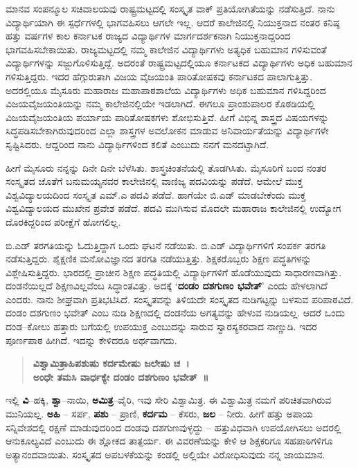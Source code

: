 ಮಾನವ ಸಂಪನ್ಮೂಲ ಸಚಿವಾಲಯವು ರಾಷ್ಟ್ರಮಟ್ಟದಲ್ಲಿ ಸಂಸ್ಕೃತ ವಾಕ್ ಪ್ರತಿಯೋಗಿತೆಯನ್ನು ನಡೆಸುತ್ತಿದೆ.  ನಾನು ವಿದ್ಯಾರ್ಥಿಯಾಗಿ ಈ ಸ್ಪರ್ಧೆಗಳಲ್ಲಿ ಭಾಗವಹಿಸಲು ಆಗಲೇ ಇಲ್ಲ.  ಆದರೆ ಕಾಲೇಜಿನಲ್ಲಿ ನಿಯುಕ್ತನಾದ ನಂತರ ಕನಿಷ್ಠ ಹತ್ತು ವರ್ಷಗಳ ಕಾಲ ಕರ್ನಾಟಕ ರಾಜ್ಯದ ವಿದ್ಯಾರ್ಥಿಗಳ ಮಾರ್ಗದರ್ಶಕನಾಗಿ ನಿಯುಕ್ತನಾದ್ದರಿಂದ ಭಾಗವಹಿಸಬೇಕಾಯಿತು.  ರಾಜ್ಯಮಟ್ಟದಲ್ಲಿ ನಮ್ಮ ಕಾಲೇಜಿನ ವಿದ್ಯಾರ್ಥಿಗಳು ಅತ್ಯಧಿಕ ಬಹುಮಾನ ಗಳಿಸುವಂತೆ ವಿದ್ಯಾರ್ಥಿಗಳನ್ನು ಸಜ್ಜುಗೊಳಿಸುತ್ತಿದ್ದೆ.  ಅದರಂತೆ ರಾಷ್ಟ್ರಮಟ್ಟದಲ್ಲಿಯೂ ಕರ್ನಾಟಕದ ವಿದ್ಯಾರ್ಥಿಗಳು ಅಧಿಕ ಬಹುಮಾನ ಗಳಿಸುತ್ತಿದ್ದರು.  ಇದರ ಹೆಗ್ಗುರುತಾಗಿ ವಿಜಯ ವೈಜಯಂತಿ ಪಾರಿತೋಷಕವು ಕರ್ನಾಟಕದ ಪಾಲಾಗುತ್ತಿತ್ತು.  ಅದರಲ್ಲಿಯೂ ಮೈಸೂರು ಮಹಾರಾಜ ಮಹಾಪಾಠಶಾಲೆಯ ವಿದ್ಯಾರ್ಥಿಗಳು ಅಧಿಕ ಬಹುಮಾನ ಗಳಿಸಿದ್ದರಿಂದ ವಿಜಯವೈಜಯಂತಿಯನ್ನು ನಮ್ಮ ಕಾಲೇಜಿನಲ್ಲಿಯೇ ಇಡಲಾಗಿದೆ.  ಈಗಲೂ ಪ್ರಾಂಶುಪಾಲರ ಕೊಠಡಿಯಲ್ಲಿ ವಿಜಯವೈಜಯಂತಿಯ ಪರ್ಯಾಯ ಪಾರಿತೋಷಕಗಳು ಶೋಭಿಸುತ್ತಿವೆ.  ಹೀಗೆ ವಿಭಿನ್ನ ಶಾಸ್ತ್ರದ ವಿಷಯಗಳನ್ನು ಸಿದ್ಧಪಡಿಸಬೇಕಾಗಿರುವುದರಿಂದ ಎಲ್ಲಾ ಶಾಸ್ತ್ರಗಳ ಅವಲೋಕನ ಮಾಡುವ ಅನಿವಾರ್ಯತೆಯನ್ನು ವಿದ್ಯಾರ್ಥಿಗಳೇ ಸೃಷ್ಟಿಸಿದರು.   ಆದ್ದರಿಂದ ನಾನು ವಿದ್ಯಾರ್ಥಿಗಳಿಂದ ಕಲಿತೆ ಎಂಬುದು ನನಗೆ ಮನದಟ್ಟಾಗಿದೆ.  

ಹೀಗೆ ಮೈಸೂರು ನನ್ನನ್ನು ದಿನೇ ದಿನೇ ಬೆಳೆಸಿತು.  ಶಾಸ್ತ್ರಚಿಂತನೆಯಲ್ಲಿ ತೊಡಗಿಸಿತು.  ಮೈಸೂರಿಗೆ ಬಂದ ನಂತರ ಸಂಸ್ಕೃತದ ಜೊತೆಗೆ ಬನುಮಯ್ಯನವರ ಕಾಲೇಜಿನಲ್ಲಿ ವಾಣಿಜ್ಯ ಪದವಿಯನ್ನು ಪಡೆದೆ. ಆಮೇಲೆ ಮುಕ್ತ ವಿಶ್ವವಿದ್ಯಾಲಯದಿಂದ ಸಂಸ್ಕೃತ ಎಮ್.ಎ ಪದವಿ ಪಡೆದೆ. ಹಾಗೆಯೇ ಬಿ.ಎಡ್ ಮಾಡಬೇಕೆಂದು ಮುಕ್ತ ವಿಶ್ವವಿದ್ಯಾಲಯದ ಮುಖೇನ ಪ್ರವೇಶ ಪಡೆದೆ. ಪದವಿ ಮುಗಿಸುವ ಮೊದಲೇ ಮಹಾರಾಜ ಕಾಲೇಜಿನಲ್ಲಿ ಉದ್ಯೋಗ ದೊರಕಿದ್ದರಿಂದ ಪರೀಕ್ಷೆಗೆ ಹೋಗಲಿಲ್ಲ.  

ಬಿ.ಎಡ್ ತರಗತಿಯನ್ನು ಓದುತ್ತಿದ್ದಾಗ ಒಂದು ಘಟನೆ ನಡೆಯಿತು.  ಬಿ.ಎಡ್ ವಿದ್ಯಾರ್ಥಿಗಳಿಗೆ ಸಂಪರ್ಕ ತರಗತಿ ನಡೆಸುತ್ತಿದ್ದರು. ಶೈಕ್ಷಣಿಕ ಮನೋವಿಜ್ಞಾನದ ತರಗತಿ ನಡೆಯುತ್ತಿತ್ತು.  ಶಿಕ್ಷಕರೊಬ್ಬರು ಶಿಕ್ಷಣ ಪದ್ಧತಿಗಳನ್ನು ವಿಶ್ಲೇಷಿಸುತ್ತಿದ್ದರು.  ಭಾರದಲ್ಲಿ ಪ್ರಾಚೀನ ಶಿಕ್ಷಣ ಪದ್ಧತಿಯಲ್ಲಿ ವಿದ್ಯಾರ್ಥಿಗಳಿಗೆ ಹೊಡೆಯುವುದು ಸಾಧಾರಣವಾಗಿತ್ತು. ದಂಡನೆಯಿಲ್ಲದೆ ಶಿಕ್ಷಣವಿಲ್ಲವೆಂಬ ಸಿದ್ಧಾಂತವಿತ್ತು.  ಅದಕ್ಕೆ ‘\textbf{ದಂಡಂ ದಶಗುಣಂ ಭವೇತ್}’ ಎಂದು ಹೇಳಲಾಗಿದೆ ಎಂದರು.  ನಾನು ಶೀಘ್ರವಾಗಿ ಪ್ರತಿಭಟಿಸಿದೆ.  ಸಂಸ್ಕೃತವನ್ನು ತಿಳಿಯದೇ ಸಂಸ್ಕೃತದ ನುಡಿಗಟ್ಟನ್ನು ಬಳಸುವ ಪರಿಪಾಠವಿದೆ.  ದಂಡಂ ದಶಗುಣಂ ಭವೇತ್ ಎಂಬ ನುಡಿ ಶಿಕ್ಷಣದಲ್ಲಿ ದಂಡನೆಯ ಅಗತ್ಯವನ್ನು ಹೇಳುವ ನುಡಿಯಲ್ಲ.  ಆದರೆ ಒಂದು ದಂಡ–ಕೋಲು ಹತ್ತಾರು ಬಗೆಯಲ್ಲಿ ಉಪಯುಕ್ತ ಎಂಬುದನ್ನು ಸಾರುವ ಸ್ವಾರಸ್ಯಕರವಾದ ನಾಣ್ಣುಡಿ.  ಇದರ ಪೂರ್ಣಪಾಠ ಹೀಗಿದೆ.  ಇದನ್ನು ಕೇಳಿದರೂ ಅರ್ಥವಾಗದು. 
\begin{verse}
{\kannadafont\bfseries ವಿಶ್ವಾಮಿತ್ರಾಹಿಪಶುಷು ಕರ್ದಮೇಷು ಜಲೇಷು ಚ~।\\
ಅಂಧೇ ತಮಸಿ ವಾರ್ಧಕ್ಯೇ ದಂಡಂ ದಶಗುಣಂ ಭವೇತ್~॥}
\end{verse}
ಇಲ್ಲಿ \textbf{ವಿ}–ಹಕ್ಕಿ, \textbf{ಶ್ವಾ}–ನಾಯಿ, \textbf{ಅಮಿತ್ರ}–ವೈರಿ, ಇವು ಸೇರಿ ವಿಶ್ವಾಮಿತ್ರ.  ಈ ವಿಶ್ವಾಮಿತ್ರ ನಮಗೆ ಪರಿಚಿತವಾಗಿರುವ ಮುನಿಯಲ್ಲ.  \textbf{ಅಹಿ} – ಸರ್ಪ, \textbf{ಪಶು} – ಪ್ರಾಣಿ, \textbf{ಕರ್ದಮ} – ಕೆಸರು, \textbf{ಜಲ} – ನೀರು.  ಹೀಗೆ ಹತ್ತು ಅಪಾಯ ಸನ್ನಿವೇಶದಲ್ಲಿ ರಕ್ಷಣೆ ಮಾಡುವುದರಿಂದ ದಂಡವು ದಶಗುಣವುಳ್ಳದ್ದು – ಹತ್ತುವಿಧವಾಗಿ ಉಪಯೋಗಿಸಲು ಅದರಲ್ಲಿ ಆನುಕೂಲ್ಯವಿದೆ ಎಂಬುದು ಈ ಶ್ಲೋಕದ ತಾತ್ಪರ್ಯ.   ಈ ವಿವರಣೆಯನ್ನು ಕೇಳಿ ಆ ಶಿಕ್ಷಕರಿಗೂ ಸಹಪಾಠಿಗಳಿಗೂ ಅತ್ಯಾನಂದವಾಯಿತು.  ಸಂಸ್ಕೃತದ ಅಪಬಳಕೆಯನ್ನು ಕಂಡಲ್ಲಿ ಅಲ್ಲಿಯೇ ವಿರೋಧಿಸುವುದು ನನ್ನ ಜಾಯಮಾನ.  

